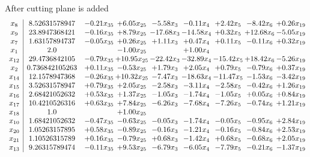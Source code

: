 \documentclass[8pt]{article}
\begin{document}
 After cutting plane is added 
\[\begin{array}{c| c c@{\hskip 2pt} c@{\hskip 2pt} c@{\hskip 2pt} c@{\hskip 2pt} c@{\hskip 2pt} c@{\hskip 2pt} c@{\hskip 2pt} }
 x_{8}   &  8.52631578947 & -0.21 x_{35} & +  6.05 x_{25} & -5.58 x_{3} & -0.11 x_{4} & +  2.42 x_{5} & -8.42 x_{6} & +  0.26 x_{19}\\
 x_{9}   &  23.8947368421 & -0.16 x_{35} & +  8.79 x_{25} & -17.68 x_{3} & -14.58 x_{4} & +  0.32 x_{5} & + 12.68 x_{6} & -5.05 x_{19}\\
 x_{7}   &  1.63157894737 & -0.05 x_{35} & +  0.26 x_{25} & +  1.11 x_{3} & +  0.47 x_{4} & +  0.11 x_{5} & -0.11 x_{6} & +  0.32 x_{19}\\
 x_{1}   &  2.0  &   & -1.00 x_{25} &   & +  1.00 x_{4} &    &    &   \\
 x_{12}   &  29.4736842105 & -0.79 x_{35} & + 10.95 x_{25} & -22.42 x_{3} & -32.89 x_{4} & -15.42 x_{5} & + 18.42 x_{6} & -5.26 x_{19}\\
 x_{2}   &  0.736842105263 & +  0.11 x_{35} & -0.53 x_{25} & +  1.79 x_{3} & +  2.05 x_{4} & +  0.79 x_{5} & -0.79 x_{6} & +  0.37 x_{19}\\
 x_{14}   &  12.1578947368 & -0.26 x_{35} & + 10.32 x_{25} & -7.47 x_{3} & -18.63 x_{4} & -11.47 x_{5} & -1.53 x_{6} & -3.42 x_{19}\\
 x_{15}   &  3.52631578947 & +  0.79 x_{35} & +  2.05 x_{25} & -2.58 x_{3} & -3.11 x_{4} & -2.58 x_{5} & -0.42 x_{6} & +  1.26 x_{19}\\
 x_{16}   &  2.68421052632 & +  0.53 x_{35} & +  1.37 x_{25} & -1.05 x_{3} & -1.74 x_{4} & -1.05 x_{5} & +  0.05 x_{6} & +  0.84 x_{19}\\
 x_{17}   &  10.4210526316 & +  0.63 x_{35} & +  7.84 x_{25} & -6.26 x_{3} & -7.68 x_{4} & -7.26 x_{5} & -0.74 x_{6} & +  1.21 x_{19}\\
 x_{18}   &  1.0  &   & +  1.00 x_{25} &    &    &    &    &   \\
 x_{10}   &  1.68421052632 & -0.47 x_{35} & -0.63 x_{25} & -0.05 x_{3} & -1.74 x_{4} & -0.05 x_{5} & -0.95 x_{6} & +  2.84 x_{19}\\
 x_{20}   &  1.05263157895 & +  0.58 x_{35} & -0.89 x_{25} & -0.16 x_{3} & -1.21 x_{4} & -0.16 x_{5} & -0.84 x_{6} & +  2.53 x_{19}\\
 x_{21}   &  1.10526315789 & +  0.16 x_{35} & -0.79 x_{25} & +  0.68 x_{3} & -1.42 x_{4} & +  0.68 x_{5} & -0.68 x_{6} & +  2.05 x_{19}\\
 x_{13}   &  9.26315789474 & -0.11 x_{35} & +  9.53 x_{25} & -6.79 x_{3} & -6.05 x_{4} & -7.79 x_{5} & -0.21 x_{6} & -1.37 x_{19}\\

\end{array}\]
\end{document}
